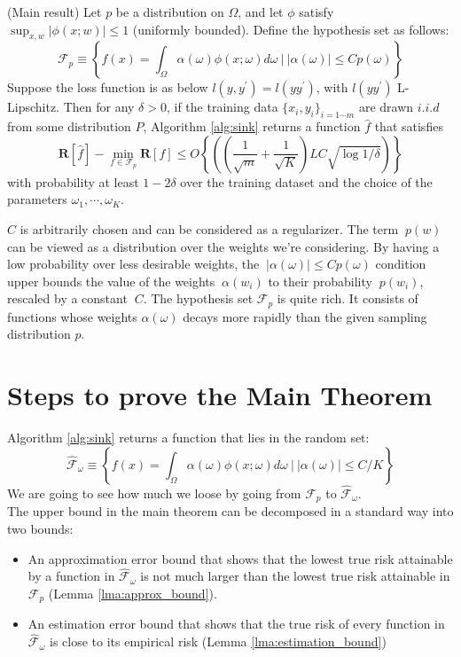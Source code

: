 \documentclass{article}
\begin{document}
\begin{thm}(Main result)
    Let $p$ be a distribution on $\Omega$, and let $\phi$ satisfy $\sup_{x,w} |\phi(x; w)| \leq 1$ (uniformly bounded).
    Define the hypothesis set as follows:
    \begin{equation}
        \mathcal{F}_p \equiv  
        \left\{f(x) = \int_\Omega \alpha(\omega)\phi(x; \omega) d\omega ~\big |~
        |\alpha(\omega)| \leq C p(\omega) \right\}
    \end{equation}
    Suppose the loss function is as below $l(y, y^{'})= l(yy^{'})$,  with $l(yy^{'})$ L-Lipschitz. Then for any $\delta > 0$, if the training data $\{x_i, y_i\}_{i=1\cdots m}$ are drawn $i.i.d$ from some distribution $P$, Algorithm \ref{alg:sink} returns a function $\hat{f}$ that satisfies
    \begin{equation*}
        \mathbf{R}[\hat{f}] - \min_{f\in \mathcal{F}_p}\mathbf{R}[f] \leq O \left\{ \left(\left(\frac{1}{\sqrt{m}} + \frac{1}{\sqrt{K}}\right)LC \sqrt{\log 1/\delta}\right)\right\}
    \end{equation*}
    with probability at least $1 - 2\delta$ over the training dataset and the choice of the parameters $\omega_1, \cdots , \omega_K$.
    \label{thm:main}
\end{thm}
$C$ is arbitrarily chosen and can be considered as a regularizer. The term $\ p(w)$ can be viewed as a distribution over the weights we're considering. By having a low probability over less desirable weights, the $\ |\alpha(\omega)| \leq C p(\omega)$ condition upper bounds the value of the weights $\ \alpha(w_i)$ to their probability $\ p(w_i)$, rescaled by a constant $\ C$.
The hypothesis set $\mathcal{F}_p$ is quite rich. It consists of functions whose weights $\alpha(\omega)$ decays more rapidly than the
given sampling distribution $p$.

\section{Steps to prove the Main Theorem}
Algorithm \ref{alg:sink} returns a function that lies in the random set:
\[
        \mathcal{\hat{F}}_\omega \equiv  
        \left\{f(x) = \int_\Omega \alpha(\omega)\phi(x; \omega) d\omega ~\big |~
        |\alpha(\omega)| \leq C/K \right\}
\]
We are going to see how much we loose by going from $\mathcal{F}_p$ to $\mathcal{\hat{F}}_\omega$.\\
The upper bound in the main theorem can be decomposed in a standard way into two bounds:
\begin{itemize}
    \item  An approximation error bound that shows that the lowest true risk attainable by a function
    in $\hat{\mathcal{F}}_\omega$ is not much larger than the lowest true risk attainable in $\mathcal{F}_p$ (Lemma \ref{lma:approx_bound}).
    
    \item An estimation error bound  that shows that the true risk  of every function in $\hat{\mathcal{F}}_\omega$ is    close to its empirical risk (Lemma \ref{lma:estimation_bound})
\end{itemize}
\end{document}

